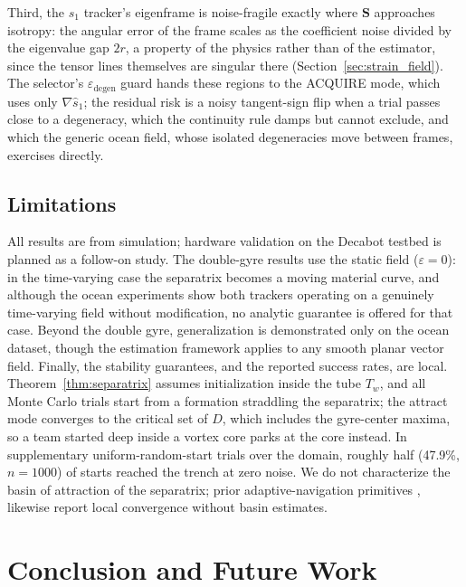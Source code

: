 \documentclass[lettersize,journal]{IEEEtran}
\begin{document}
Third, the $s_1$ tracker's eigenframe is noise-fragile exactly where
$\mathbf{S}$ approaches isotropy: the angular error of the frame
scales as the coefficient noise divided by the eigenvalue gap $2r$, a
property of the physics rather than of the estimator, since the tensor
lines themselves are singular there
(Section~\ref{sec:strain_field}). The selector's
$\varepsilon_{\text{degen}}$ guard hands these regions to the ACQUIRE
mode, which uses only $\nabla\hat{s}_1$; the residual risk is a noisy
tangent-sign flip when a trial passes close to a degeneracy, which the
continuity rule damps but cannot exclude, and which the generic ocean
field, whose isolated degeneracies move between frames, exercises
directly.


\subsection{Limitations}
\label{sec:limitations}

All results are from simulation; hardware validation on the Decabot
testbed is planned as a follow-on study. The double-gyre results use
the static field ($\varepsilon = 0$): in the time-varying case the
separatrix becomes a moving material curve, and although the ocean
experiments show both trackers operating on a genuinely time-varying
field without modification, no analytic guarantee is offered for that
case. Beyond the double gyre, generalization is demonstrated only on
the ocean dataset, though the estimation framework applies to any
smooth planar vector field. Finally, the stability guarantees, and the
reported success rates, are local. Theorem~\ref{thm:separatrix}
assumes initialization inside the tube $T_w$, and all Monte Carlo
trials start from a formation straddling the separatrix; the attract
mode converges to the critical set of $D$, which includes the
gyre-center maxima, so a team started deep inside a vortex core parks
at the core instead. In supplementary uniform-random-start trials over
the domain, roughly half (47.9\%, $n = 1000$) of starts reached the
trench at zero noise. We do not characterize the basin of attraction
of the separatrix; prior adaptive-navigation primitives \cite{27},
\cite{28} likewise report local convergence without basin estimates.


\section{Conclusion and Future Work}
\label{sec:conclusion}
\label{sec:future}
\end{document}
